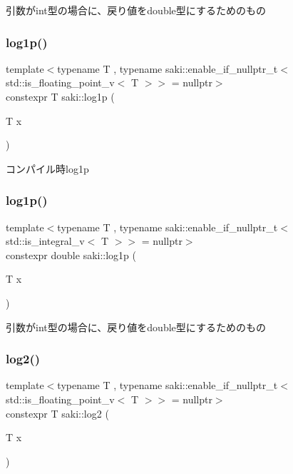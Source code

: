引数がint型の場合に、戻り値をdouble型にするためのもの 

\mbox{\label{namespacesaki_ae0b2550b674acc69fa1fbe407917fdc7}} 
\subsubsection{\texorpdfstring{log1p()}{log1p()}\hspace{0.1cm}{\footnotesize\ttfamily [1/2]}}
{\footnotesize\ttfamily template$<$typename T , typename saki\+::enable\+\_\+if\+\_\+nullptr\+\_\+t$<$ std\+::is\+\_\+floating\+\_\+point\+\_\+v$<$ T $>$$>$  = nullptr$>$ \\
constexpr T saki\+::log1p (\begin{DoxyParamCaption}\item[{T}]{x }\end{DoxyParamCaption})}



コンパイル時log1p 

\mbox{\label{namespacesaki_aec755aa143bd9a0d03c5ebb2dc5dd3de}} 
\subsubsection{\texorpdfstring{log1p()}{log1p()}\hspace{0.1cm}{\footnotesize\ttfamily [2/2]}}
{\footnotesize\ttfamily template$<$typename T , typename saki\+::enable\+\_\+if\+\_\+nullptr\+\_\+t$<$ std\+::is\+\_\+integral\+\_\+v$<$ T $>$$>$  = nullptr$>$ \\
constexpr double saki\+::log1p (\begin{DoxyParamCaption}\item[{T}]{x }\end{DoxyParamCaption})}



引数がint型の場合に、戻り値をdouble型にするためのもの 

\mbox{\label{namespacesaki_ac184cde6c3531e01531219e081e25452}} 
\subsubsection{\texorpdfstring{log2()}{log2()}\hspace{0.1cm}{\footnotesize\ttfamily [1/2]}}
{\footnotesize\ttfamily template$<$typename T , typename saki\+::enable\+\_\+if\+\_\+nullptr\+\_\+t$<$ std\+::is\+\_\+floating\+\_\+point\+\_\+v$<$ T $>$$>$  = nullptr$>$ \\
constexpr T saki\+::log2 (\begin{DoxyParamCaption}\item[{T}]{x }\end{DoxyParamCaption})}



